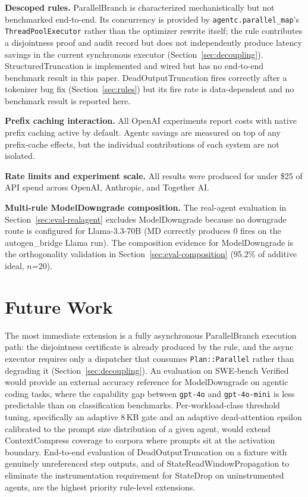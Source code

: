 \textbf{Descoped rules.} ParallelBranch is characterized mechanistically but not
benchmarked end-to-end. Its concurrency is provided by
\texttt{agentc.parallel\_map}'s \texttt{ThreadPoolExecutor} rather than the
optimizer rewrite itself; the rule contributes a disjointness proof and audit record
but does not independently produce latency savings in the current synchronous
executor (Section~\ref{sec:decoupling}). StructuredTruncation is implemented and
wired but has no end-to-end benchmark result in this paper.
DeadOutputTruncation fires correctly after a tokenizer bug fix
(Section~\ref{sec:rules}) but its fire rate is data-dependent and no benchmark
result is reported here.

\textbf{Prefix caching interaction.} All OpenAI experiments report costs with native
prefix caching active by default. Agentc savings are measured on top of any
prefix-cache effects, but the individual contributions of each system are not isolated.

\textbf{Rate limits and experiment scale.} All results were produced for under \$25 of
API spend across OpenAI, Anthropic, and Together AI.

\textbf{Multi-rule ModelDowngrade composition.} The real-agent evaluation in
Section~\ref{sec:eval-realagent} excludes ModelDowngrade because no downgrade route
is configured for Llama-3.3-70B (MD correctly produces 0 fires on the autogen\_bridge
Llama run). The composition evidence for ModelDowngrade is the orthogonality
validation in Section~\ref{sec:eval-composition} (95.2\% of additive ideal, $n$=20).

\section{Future Work}
\label{sec:futurework}

The most immediate extension is a fully asynchronous ParallelBranch execution path:
the disjointness certificate is already produced by the rule, and the async executor
requires only a dispatcher that consumes \texttt{Plan::Parallel} rather than
degrading it (Section~\ref{sec:decoupling}). An evaluation on SWE-bench
Verified~\cite{jimenez2024swebench} would provide an external accuracy reference for
ModelDowngrade on agentic coding tasks, where the capability gap between
\texttt{gpt-4o} and \texttt{gpt-4o-mini} is less predictable than on classification
benchmarks. Per-workload-class threshold tuning, specifically an adaptive 8\,KB gate
and an adaptive dead-attention epsilon calibrated to the prompt size distribution of
a given agent, would extend ContextCompress coverage to corpora where prompts sit at
the activation boundary. End-to-end evaluation of DeadOutputTruncation on a fixture
with genuinely unreferenced step outputs, and of StateReadWindowPropagation to
eliminate the instrumentation requirement for StateDrop on uninstrumented agents, are
the highest priority rule-level extensions.

